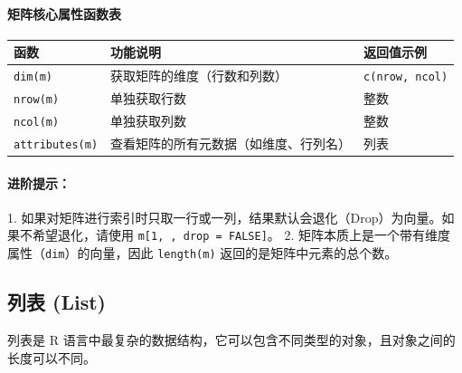 \paragraph{矩阵核心属性函数表}
\begin{table}[h]
\centering
\renewcommand{\arraystretch}{1.5}
\begin{tabular}{|l|l|l|}
\hline
\textbf{函数} & \textbf{功能说明} & \textbf{返回值示例} \\ \hline
\texttt{dim(m)} & 获取矩阵的维度（行数和列数） & \texttt{c(nrow, ncol)} \\ \hline
\texttt{nrow(m)} & 单独获取行数 & 整数 \\ \hline
\texttt{ncol(m)} & 单独获取列数 & 整数 \\ \hline
\texttt{attributes(m)} & 查看矩阵的所有元数据（如维度、行列名） & 列表 \\ \hline
\end{tabular}
\end{table}

\paragraph{进阶提示：}
1. 如果对矩阵进行索引时只取一行或一列，结果默认会退化（Drop）为向量。如果不希望退化，请使用 \texttt{m[1, , drop = FALSE]}。
2. 矩阵本质上是一个带有维度属性（\texttt{dim}）的向量，因此 \texttt{length(m)} 返回的是矩阵中元素的总个数。

\subsection{列表 (List)}

列表是 R 语言中最复杂的数据结构，它可以包含不同类型的对象，且对象之间的长度可以不同。

